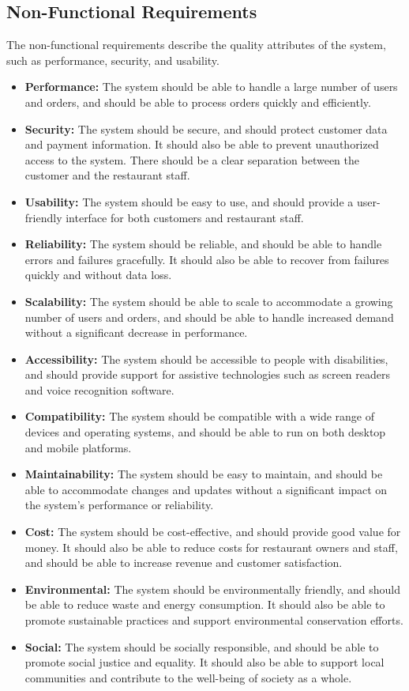 \subsection*{Non-Functional Requirements}
The non-functional requirements describe the quality attributes of the system, such as performance, security, and usability.

\begin{itemize}
    \item \textbf{Performance:} The system should be able to handle a large number of users and orders, and should be able to process orders quickly and efficiently.
    \item \textbf{Security:} The system should be secure, and should protect customer data and payment information. It should also be able to prevent unauthorized access to the system. There should be a clear separation between the customer and the restaurant staff.
    \item \textbf{Usability:} The system should be easy to use, and should provide a user-friendly interface for both customers and restaurant staff.
    \item \textbf{Reliability:} The system should be reliable, and should be able to handle errors and failures gracefully. It should also be able to recover from failures quickly and without data loss.
    \item \textbf{Scalability:} The system should be able to scale to accommodate a growing number of users and orders, and should be able to handle increased demand without a significant decrease in performance.
    \item \textbf{Accessibility:} The system should be accessible to people with disabilities, and should provide support for assistive technologies such as screen readers and voice recognition software.
    \item \textbf{Compatibility:} The system should be compatible with a wide range of devices and operating systems, and should be able to run on both desktop and mobile platforms.
    \item \textbf{Maintainability:} The system should be easy to maintain, and should be able to accommodate changes and updates without a significant impact on the system's performance or reliability.
    \item \textbf{Cost:} The system should be cost-effective, and should provide good value for money. It should also be able to reduce costs for restaurant owners and staff, and should be able to increase revenue and customer satisfaction.
    \item \textbf{Environmental:} The system should be environmentally friendly, and should be able to reduce waste and energy consumption. It should also be able to promote sustainable practices and support environmental conservation efforts.
    \item \textbf{Social:} The system should be socially responsible, and should be able to promote social justice and equality. It should also be able to support local communities and contribute to the well-being of society as a whole.
    
\end{itemize}